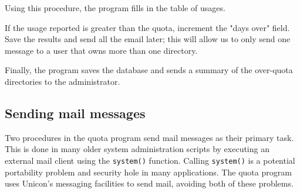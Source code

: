 Using this procedure, the program fills in the table of usages.


If the usage reported is greater than the quota, increment the
"days over" field. Save the results and
send all the email later; this will allow us to only send one message
to a user that owns more than one directory.


Finally, the program saves the database and sends a summary of the
over-quota directories to the administrator.


\subsection*{Sending mail messages}

Two procedures in the quota program send mail messages as their primary
task. This is done in many older system administration scripts by
executing an external mail client using the \texttt{system()} function.
Calling \texttt{system()} is a potential portability
problem and security hole in many applications. The quota program uses
Unicon's messaging facilities to send mail, avoiding
both of these problems.

